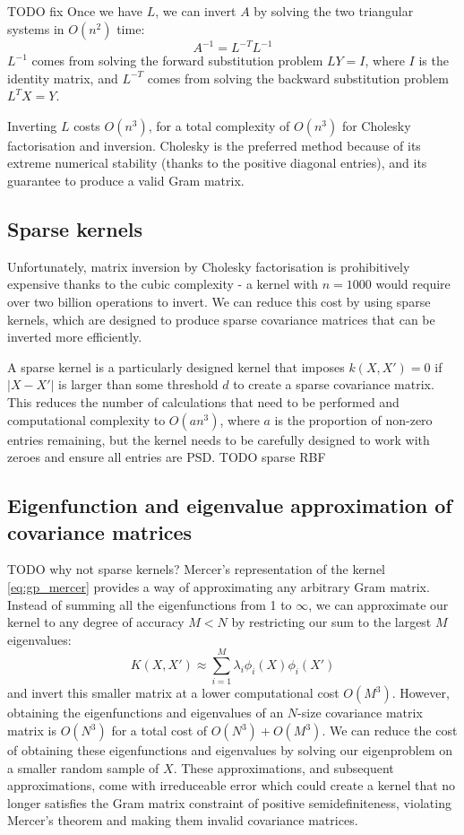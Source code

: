 TODO fix
Once we have $L$, we can invert $A$ by solving the two triangular systems in $O(n^2)$ time:
\begin{equation*}
    A^{-1} = L^{-T} L^{-1}
\end{equation*}
$L^{-1}$ comes from solving the forward substitution problem $LY = I$, where $I$ is the identity matrix, and $L^{-T}$ comes from solving the backward substitution problem $L^TX = Y$.

Inverting $L$ costs $O(n^3)$, for a total complexity of $O(n^3)$ for Cholesky factorisation and inversion. Cholesky is the preferred method because of its extreme numerical stability (thanks to the positive diagonal entries), and its guarantee to produce a valid Gram matrix.

\subsection{Sparse kernels}
Unfortunately, matrix inversion by Cholesky factorisation is prohibitively expensive thanks to the cubic complexity - a kernel with $n = 1000$ would require over two billion operations to invert. We can reduce this cost by using sparse kernels, which are designed to produce sparse covariance matrices that can be inverted more efficiently.

A sparse kernel \cite{big-data} is a particularly designed kernel that imposes $k(X,X') = 0$ if $|X - X'|$ is larger than some threshold $d$ to create a sparse covariance matrix. This reduces the number of calculations that need to be performed and computational complexity to $O(an^3)$, where $a$ is the proportion of non-zero entries remaining, but the kernel needs to be carefully designed to work with zeroes and ensure all entries are PSD. TODO sparse RBF


\subsection{Eigenfunction and eigenvalue approximation of covariance matrices \cite{gp-ml}}
TODO why not sparse kernels? Mercer's representation of the kernel \ref{eq:gp_mercer} provides a way of approximating any arbitrary Gram matrix. Instead of summing all the eigenfunctions from 1 to $\infty$, we can approximate our kernel to any degree of accuracy $M < N$ by restricting our sum to the largest $M$ eigenvalues:
\begin{equation} \label{eq:gp_mercer_approx}
    K(X, X') \approx \sum_{i=1}^{M} \lambda_i \phi_i(X) \phi_i(X')
\end{equation}
and invert this smaller matrix at a lower computational cost $O(M^3)$. However, obtaining the eigenfunctions and eigenvalues of an $N$-size covariance matrix matrix is $O(N^3)$ for a total cost of $O(N^3) + O(M^3)$. We can reduce the cost of obtaining these eigenfunctions and eigenvalues by solving our eigenproblem on a smaller random sample of $X$. These approximations, and subsequent approximations, come with irreduceable error which could create a kernel that no longer satisfies the Gram matrix constraint of positive semidefiniteness, violating Mercer's theorem and making them invalid covariance matrices. 

